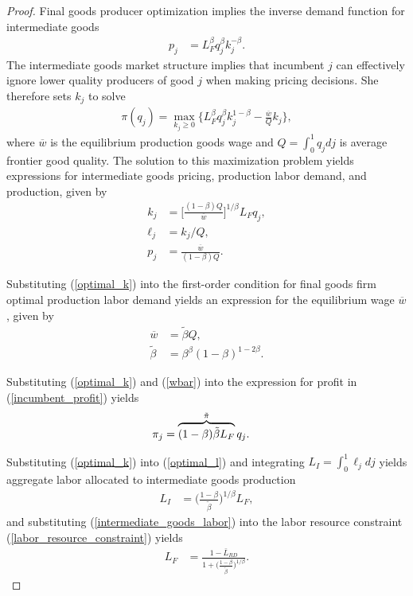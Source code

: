 \documentclass[11pt,english]{article}
\theoremstyle{definition}
\begin{document}
\begin{proof}
	Final goods producer optimization implies the inverse demand function for intermediate goods
	\begin{align*}
		p_j &= L_F^{\beta} q_j^{\beta} k_j^{-\beta}.
	\end{align*}
	The intermediate goods market structure implies that incumbent $j$ can effectively ignore lower quality producers of good $j$ when making pricing decisions. She therefore sets $k_j$ to solve
	\begin{align}
		\pi(q_j) = \max_{k_j \ge 0} \Big\{ L_F^{\beta} q_j^{\beta} k_j^{1-\beta} - \frac{\overline{w}}{Q} k_j \Big\}, \label{incumbent_profit}
	\end{align}
	where $\overline{w}$ is the equilibrium production goods wage and $Q = \int_0^1 q_j dj$ is average frontier good quality. The solution to this maximization problem yields expressions for intermediate goods pricing, production labor demand, and production, given by 
	\begin{align}
		k_j &= \Big[ \frac{(1-\beta) Q}{\overline{w}} \Big]^{1/\beta}L_F q_j,  \label{optimal_k}\\
		\ell_j &= k_j / Q, \label{optimal_l}\\
		p_j &= \frac{\overline{w}}{(1-\beta) Q}. \label{optimal_p}
	\end{align}
	
	Substituting (\ref{optimal_k}) into the first-order condition for final goods firm optimal production labor demand yields an expression for the equilibrium wage $\overline{w}$, given by 
	\begin{align}
		\overline{w} &= \tilde{\beta} Q, \label{wbar} \\
		\tilde{\beta} &= \beta^{\beta} (1-\beta)^{1-2\beta}. \label{def_cbeta}
	\end{align}
	
	Substituting (\ref{optimal_k}) and (\ref{wbar}) into the expression for profit in (\ref{incumbent_profit}) yields
	\begin{align}
		\pi_j &= \overbrace{(1-\beta) \tilde{\beta} L_F}^{\mathclap{\tilde{\pi}}} q_j. \label{profits_eq}
	\end{align}
	
	Substituting (\ref{optimal_k}) into (\ref{optimal_l}) and integrating $L_I = \int_0^1 \ell_j dj$ yields aggregate labor allocated to intermediate goods production 
	\begin{align}
		L_I &= \Big( \frac{1-\beta}{\tilde{\beta}} \Big)^{1 / \beta} L_F, \label{intermediate_goods_labor}
	\end{align}
	and substituting (\ref{intermediate_goods_labor}) into the labor resource constraint (\ref{labor_resource_constraint}) yields
	\begin{align}
		L_F &= \frac{1 - \bar{L}_{RD}}{1 + \Big(\frac{1-\beta}{\tilde{\beta}}\Big)^{1/\beta}}.
	\end{align}
	

\end{proof}
\end{document}
